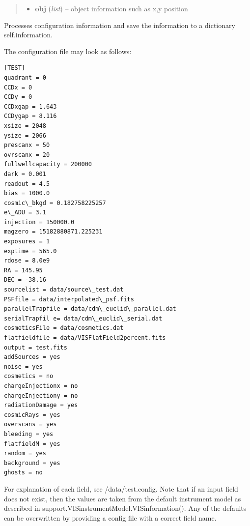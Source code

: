 \documentclass[a4paper,11pt,english]{sphinxmanual}
\begin{document}
\begin{fulllineitems}
\begin{fulllineitems}
\begin{quote}
\begin{description}
\begin{itemize}
\item {} 
\textbf{obj} (\emph{list}) -- object information such as x,y position

\end{itemize}

\end{description}\end{quote}

\end{fulllineitems}


\begin{fulllineitems}
\label{simulator:simulator.simulator.VISsimulator.processConfigs}
Processes configuration information and save the information to a dictionary self.information.

The configuration file may look as follows:

\begin{Verbatim}[commandchars=\\\{\}]
[TEST]
quadrant = 0
CCDx = 0
CCDy = 0
CCDxgap = 1.643
CCDygap = 8.116
xsize = 2048
ysize = 2066
prescanx = 50
ovrscanx = 20
fullwellcapacity = 200000
dark = 0.001
readout = 4.5
bias = 1000.0
cosmic\_bkgd = 0.182758225257
e\_ADU = 3.1
injection = 150000.0
magzero = 15182880871.225231
exposures = 1
exptime = 565.0
rdose = 8.0e9
RA = 145.95
DEC = -38.16
sourcelist = data/source\_test.dat
PSFfile = data/interpolated\_psf.fits
parallelTrapfile = data/cdm\_euclid\_parallel.dat
serialTrapfil e= data/cdm\_euclid\_serial.dat
cosmeticsFile = data/cosmetics.dat
flatfieldfile = data/VISFlatField2percent.fits
output = test.fits
addSources = yes
noise = yes
cosmetics = no
chargeInjectionx = no
chargeInjectiony = no
radiationDamage = yes
cosmicRays = yes
overscans = yes
bleeding = yes
flatfieldM = yes
random = yes
background = yes
ghosts = no
\end{Verbatim}

For explanation of each field, see /data/test.config. Note that if an input field does not exist,
then the values are taken from the default instrument model as described in
support.VISinstrumentModel.VISinformation(). Any of the defaults can be overwritten by providing
a config file with a correct field name.

\end{fulllineitems}



\end{fulllineitems}
\end{document}
